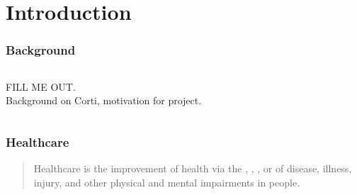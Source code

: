
\section{Introduction}

\begin{frame}
    \frametitle{Background}
    \begin{columns}
        \begin{column}{0.6\textwidth}
            FILL ME OUT. \\
            Background on Corti, motivation for project.
        \end{column}
        \begin{column}{0.4\textwidth}
        \end{column}
    \end{columns}
\end{frame}


\begin{frame}
    \frametitle{Healthcare}
    \begin{quotation}
        \noindent\centering
        Healthcare is the improvement of health via the , , ,  or  of {\color{theme-green}disease}, {\color{theme-green}illness}, {\color{theme-green}injury}, and {\color{theme-green}other physical and mental impairments} in people.
    \end{quotation}
\end{frame}





